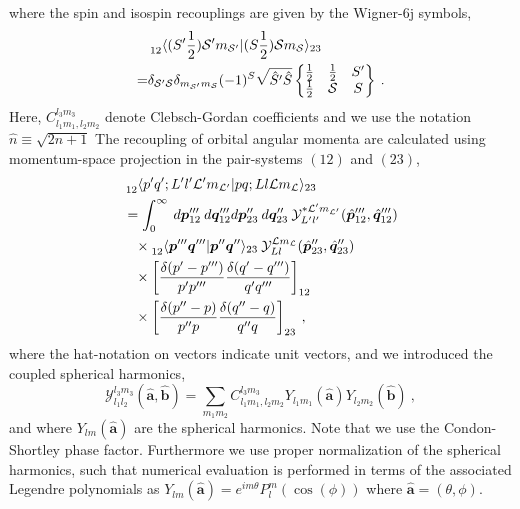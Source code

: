 \documentclass[aps,prc,showpacs,twocolumn,floatfix,nobibnotes,nofootinbib,amsmath,amssymb,longbibliography]{revtex4-2}
\begin{document}
where the spin and isospin recouplings are given by the Wigner-6j
symbols,
\begin{align}
	\begin{split}
	&\prescript{}{12}{\langle}(S'\frac{1}{2})\mathcal{S}'m_{\mathcal{S}'}|(S\frac{1}{2})\mathcal{S}m_{\mathcal{S}}\rangle_{23} \\
	=& \delta_{\mathcal{S}'\mathcal{S}}\delta_{m_{\mathcal{S}'}m_{\mathcal{S}}}(-1)^{S}\sqrt{\hat{S}'\hat{S}}
	\begin{Bmatrix}
	\frac{1}{2} & \frac{1}{2} & S' \\
	\frac{1}{2} & \mathcal{S} & S
	\end{Bmatrix}\:.
	\end{split}
\end{align}
Here, $C_{l_1m_1,l_2m_2}^{l_3m_3}$ denote Clebsch-Gordan
coefficients and we use the notation $\hat{n}\equiv \sqrt{2n+1}$
The recoupling of orbital angular momenta are calculated
using momentum-space projection in the pair-systems $(12)$ and $(23)$,
\begin{align}
	\begin{split}
	&\prescript{}{12}{\langle} p'q';L'l'\mathcal{L}'m_{\mathcal{L}'}|pq;Ll\mathcal{L}m_{\mathcal{L}}\rangle_{23}\\
	&= \int_0^\infty \:d\bm{p}_{12}'''\:d\bm{q}_{12}'''d\bm{p}_{23}''\:d\bm{q}_{23}''\: \mathcal{Y}_{L'l'}^{*\mathcal{L}'m_{\mathcal{L}'}}(\hat{\bm{p}}_{12}''',\hat{\bm{q}}_{12}''')\\
	&\hphantom{=}\times \prescript{}{12}{\langle} \bm{p}'''\bm{q}'''|\bm{p}''\bm{q}''\rangle_{23} \: \mathcal{Y}_{Ll}^{\mathcal{L}m_{\mathcal{L}}}(\hat{\bm{p}}_{23}'',\hat{\bm{q}}_{23}'') \\
	&\hphantom{=}\times \left[\frac{\delta(p'-p''')}{p'p'''}\frac{\delta(q'-q''')}{q'q'''}\right]_{12} \\
	&\hphantom{=}\times \left[\frac{\delta(p''-p)}{p''p}\frac{\delta(q''-q)}{q''q}\right]_{23}\:,\\
	\end{split}
	\label{eq | permutation matrix element calculation step 1}
\end{align}
where the hat-notation on vectors indicate unit vectors, and we introduced the coupled spherical harmonics,
\begin{equation}
	\mathcal{Y}_{l_1l_2}^{l_3m_3}(\hat{\bm{a}},\hat{\bm{b}}) = \sum_{m_1m_2} C_{l_1m_1,l_2m_2}^{l_3m_3} Y_{l_1m_1}(\hat{\bm{a}})Y_{l_2m_2}(\hat{\bm{b}})\:,
	\label{eq | definition of coupled spherical harmonics}
\end{equation}
and where $Y_{lm}(\hat{\bm{a}})$ are the spherical harmonics. Note that we
use the Condon-Shortley phase factor. Furthermore we use proper
normalization of the spherical harmonics, such that numerical
evaluation is performed in terms of the associated Legendre
polynomials as $Y_{lm}(\hat{\bm{a}}) = e^{im\theta} P_l^m(\cos(\phi))$
where $\hat{\bm{a}}=(\theta,\phi)$.
\end{document}
